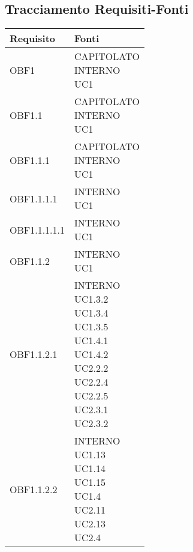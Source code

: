 \documentclass{scalatekids-article}
\begin{document}
\subsection{Tracciamento Requisiti-Fonti}
\begin{longtable}[H]{|p{5.5cm}|p{5.5cm}|}
  \hline
  \textbf{Requisito} & \textbf{Fonti}\\
  \hline
  OBF1 & \multiLineCell[t]{CAPITOLATO\\INTERNO\\UC1\\}\\
  \hline
  OBF1.1 & \multiLineCell[t]{CAPITOLATO\\INTERNO\\UC1\\}\\
  \hline
  OBF1.1.1 & \multiLineCell[t]{CAPITOLATO\\INTERNO\\UC1\\}\\
  \hline
  OBF1.1.1.1 & \multiLineCell[t]{INTERNO\\UC1\\}\\
  \hline
  OBF1.1.1.1.1 & \multiLineCell[t]{INTERNO\\UC1\\}\\
  \hline
  OBF1.1.2 & \multiLineCell[t]{INTERNO\\UC1\\}\\
  \hline
  OBF1.1.2.1 & \multiLineCell[t]{INTERNO\\UC1.3.2\\UC1.3.4\\UC1.3.5\\UC1.4.1\\UC1.4.2\\UC2.2.2\\UC2.2.4\\UC2.2.5\\UC2.3.1\\UC2.3.2\\}\\
  \hline
  OBF1.1.2.2 & \multiLineCell[t]{INTERNO\\UC1.13\\UC1.14\\UC1.15\\UC1.4\\UC2.11\\UC2.13\\UC2.4\\}\\

\end{longtable}
\end{document}
